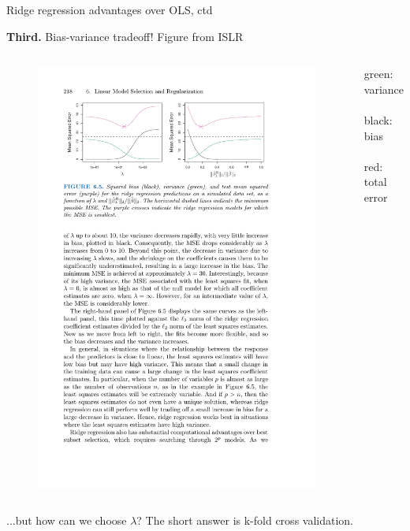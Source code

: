 \documentclass[mathserif, handout, aspectratio=169]{beamer}
\begin{document}
\begin{frame}{Ridge regression advantages over OLS, ctd}

\textbf{Third.}  Bias-variance tradeoff! {\tiny Figure from ISLR}

\begin{columns}
\begin{figure}
\includegraphics[scale=1.1]{bias-variance-ridge}
\end{figure}


green: variance\\~\\
black: bias\\~\\
red: total error

\end{columns}

...but how can we choose $\lambda$?  The short answer is k-fold cross validation.

\end{frame}
\end{document}
